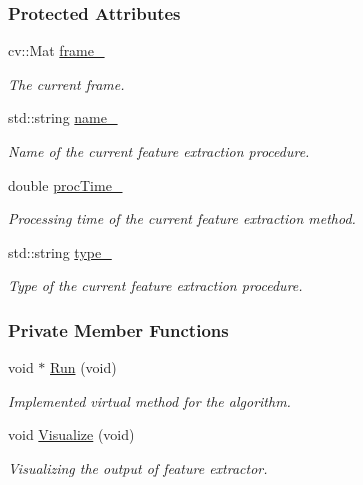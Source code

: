 \subsubsection*{Protected Attributes}
\begin{DoxyCompactItemize}
\item 
cv\-::\-Mat \hyperlink{group___feature_extractor_aae4295da2c3999edcb99b46d70ee7166}{frame\-\_\-}
\begin{DoxyCompactList}\small\item\em The current frame. \end{DoxyCompactList}\item 
std\-::string \hyperlink{group___feature_extractor_abee52be830de272bd27685083bf28aae}{name\-\_\-}
\begin{DoxyCompactList}\small\item\em Name of the current feature extraction procedure. \end{DoxyCompactList}\item 
double \hyperlink{group___feature_extractor_aa3306975b929f5503dac51829f9e04a0}{proc\-Time\-\_\-}
\begin{DoxyCompactList}\small\item\em Processing time of the current feature extraction method. \end{DoxyCompactList}\item 
std\-::string \hyperlink{group___feature_extractor_ad467857c4bc3d0fe65ba29e3b8f7c796}{type\-\_\-}
\begin{DoxyCompactList}\small\item\em Type of the current feature extraction procedure. \end{DoxyCompactList}\end{DoxyCompactItemize}
\subsubsection*{Private Member Functions}
\begin{DoxyCompactItemize}
\item 
void $\ast$ \hyperlink{group___feature_extractor_a03df7e2408a60e20a62468652c17d615}{Run} (void)
\begin{DoxyCompactList}\small\item\em Implemented virtual method for the algorithm. \end{DoxyCompactList}\item 
void \hyperlink{group___feature_extractor_aae5833316f46595edaf6dd635e391d4e}{Visualize} (void)
\begin{DoxyCompactList}\small\item\em Visualizing the output of feature extractor. \end{DoxyCompactList}\end{DoxyCompactItemize}


